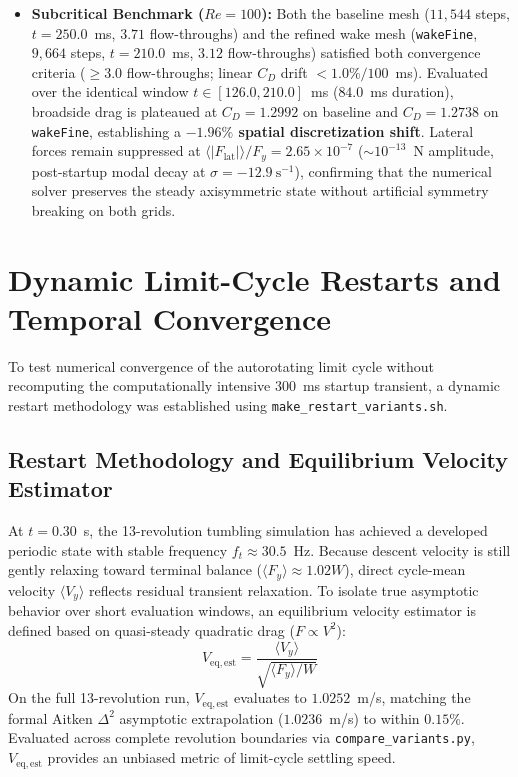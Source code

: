 \documentclass[11pt,a4paper]{article}
\begin{document}
\begin{itemize}
    \item \textbf{Subcritical Benchmark ($Re = 100$):} Both the baseline mesh ($11,544$ steps, $t = 250.0$~ms, $3.71$ flow-throughs) and the refined wake mesh (\texttt{wakeFine}, $9,664$ steps, $t = 210.0$~ms, $3.12$ flow-throughs) satisfied both convergence criteria ($\ge 3.0$ flow-throughs; linear $C_D$ drift $< 1.0\% / 100$~ms). Evaluated over the identical window $t \in [126.0, 210.0]$~ms ($84.0$~ms duration), broadside drag is plateaued at $C_D = 1.2992$ on baseline and $C_D = 1.2738$ on \texttt{wakeFine}, establishing a \textbf{$-1.96\%$ spatial discretization shift}. Lateral forces remain suppressed at $\langle |F_{\mathrm{lat}}| \rangle / F_y = 2.65 \times 10^{-7}$ ($\sim 10^{-13}$~N amplitude, post-startup modal decay at $\sigma = -12.9\ \mathrm{s}^{-1}$), confirming that the numerical solver preserves the steady axisymmetric state without artificial symmetry breaking on both grids.
\end{itemize}

\section{Dynamic Limit-Cycle Restarts and Temporal Convergence}

To test numerical convergence of the autorotating limit cycle without recomputing the computationally intensive $300$~ms startup transient, a dynamic restart methodology was established using \texttt{make\_restart\_variants.sh}.

\subsection{Restart Methodology and Equilibrium Velocity Estimator}
At $t = 0.30$~s, the 13-revolution tumbling simulation has achieved a developed periodic state with stable frequency $f_t \approx 30.5$~Hz. Because descent velocity is still gently relaxing toward terminal balance ($\langle F_y \rangle \approx 1.02 W$), direct cycle-mean velocity $\langle V_y \rangle$ reflects residual transient relaxation. To isolate true asymptotic behavior over short evaluation windows, an equilibrium velocity estimator is defined based on quasi-steady quadratic drag ($F \propto V^2$):
\begin{equation}
V_{\mathrm{eq,est}} = \frac{\langle V_y \rangle}{\sqrt{\langle F_y \rangle / W}}
\end{equation}
On the full 13-revolution run, $V_{\mathrm{eq,est}}$ evaluates to $1.0252$~m/s, matching the formal Aitken $\Delta^2$ asymptotic extrapolation ($1.0236$~m/s) to within $0.15\%$. Evaluated across complete revolution boundaries via \texttt{compare\_variants.py}, $V_{\mathrm{eq,est}}$ provides an unbiased metric of limit-cycle settling speed.
\end{document}
